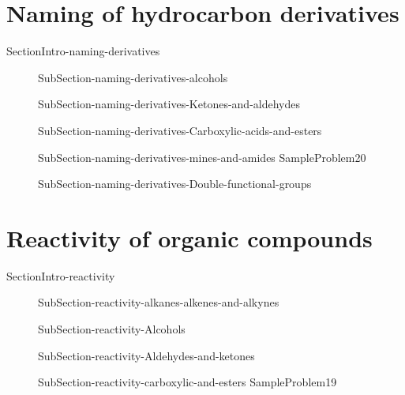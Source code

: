 \documentclass[main.tex]{subfiles}
\newcommand\chapterlabel{Ch-orgo}\setcounter{figurenewcounter}{0}\setcounter{tablenewcounter}{0}\setcounter{formulanewcounter}{0}
\begin{document}
{ \section{Naming of hydrocarbon derivatives}{SectionIntro-naming-derivatives}
\sloppy\begin{description}
\item[] {SubSection-naming-derivatives-alcohols}
\item[] {SubSection-naming-derivatives-Ketones-and-aldehydes}
\item[] {SubSection-naming-derivatives-Carboxylic-acids-and-esters}
\item[] {SubSection-naming-derivatives-mines-and-amides}
 {SampleProblem20}
 \item[] {SubSection-naming-derivatives-Double-functional-groups}
 \end{description}
 
 
\section{Reactivity of organic compounds}{SectionIntro-reactivity}
\sloppy\begin{description}
\item[] {SubSection-reactivity-alkanes-alkenes-and-alkynes}
\item[] {SubSection-reactivity-Alcohols}
 \item[] {SubSection-reactivity-Aldehydes-and-ketones}
 \item[] {SubSection-reactivity-carboxylic-and-esters}
  {SampleProblem19}
 \end{description}
 
 }
 
 
\checkoddpage\ifoddpage \clearpage\thispagestyle{empty}\mbox{}\clearpage \else  \fi 
\end{document}
